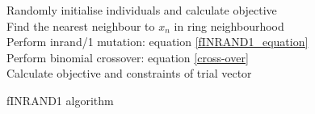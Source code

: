 \begin{algorithm}
\SetAlgoNoLine
 Randomly initialise individuals and calculate objective\\
 {
  {
  Find the nearest neighbour to $x_n$ in ring neighbourhood\\
  Perform inrand/1 mutation: equation \ref{fINRAND1_equation}\\
  Perform binomial crossover: equation \ref{cross-over}\\
  Calculate objective and constraints of trial vector
  }
 }
 \caption{fINRAND1 algorithm}
 \label{fINRAND1 algorithm}
\end{algorithm}